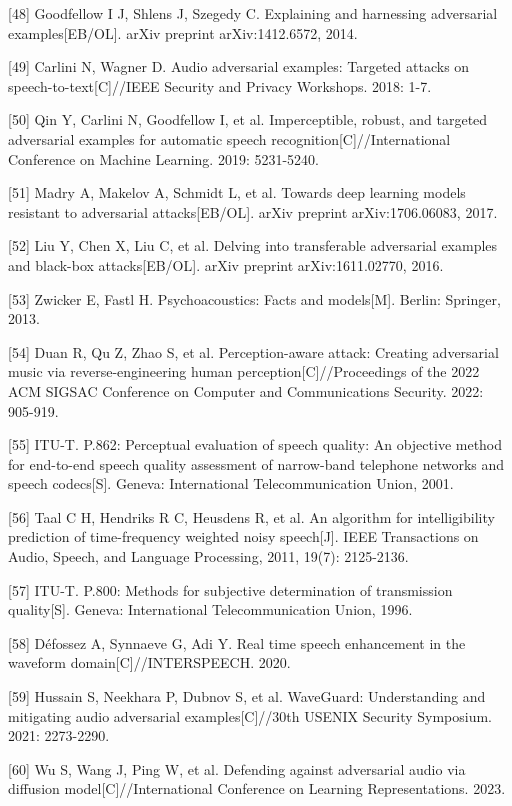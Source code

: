 \begin{referencesblock}
{[}48{]} Goodfellow I J, Shlens J, Szegedy C. Explaining and harnessing
adversarial examples{[}EB/OL{]}. arXiv preprint arXiv:1412.6572, 2014.

{[}49{]} Carlini N, Wagner D. Audio adversarial examples: Targeted
attacks on speech-to-text{[}C{]}//IEEE Security and Privacy Workshops.
2018: 1-7.

{[}50{]} Qin Y, Carlini N, Goodfellow I, et al. Imperceptible, robust,
and targeted adversarial examples for automatic speech
recognition{[}C{]}//International Conference on Machine Learning. 2019:
5231-5240.

{[}51{]} Madry A, Makelov A, Schmidt L, et al. Towards deep learning
models resistant to adversarial attacks{[}EB/OL{]}. arXiv preprint
arXiv:1706.06083, 2017.

{[}52{]} Liu Y, Chen X, Liu C, et al. Delving into transferable
adversarial examples and black-box attacks{[}EB/OL{]}. arXiv preprint
arXiv:1611.02770, 2016.

{[}53{]} Zwicker E, Fastl H. Psychoacoustics: Facts and models{[}M{]}.
Berlin: Springer, 2013.

{[}54{]} Duan R, Qu Z, Zhao S, et al. Perception-aware attack: Creating
adversarial music via reverse-engineering human
perception{[}C{]}//Proceedings of the 2022 ACM SIGSAC Conference on
Computer and Communications Security. 2022: 905-919.

{[}55{]} ITU-T. P.862: Perceptual evaluation of speech quality: An
objective method for end-to-end speech quality assessment of narrow-band
telephone networks and speech codecs{[}S{]}. Geneva: International
Telecommunication Union, 2001.

{[}56{]} Taal C H, Hendriks R C, Heusdens R, et al. An algorithm for
intelligibility prediction of time-frequency weighted noisy
speech{[}J{]}. IEEE Transactions on Audio, Speech, and Language
Processing, 2011, 19(7): 2125-2136.

{[}57{]} ITU-T. P.800: Methods for subjective determination of
transmission quality{[}S{]}. Geneva: International Telecommunication
Union, 1996.

{[}58{]} Défossez A, Synnaeve G, Adi Y. Real time speech enhancement in
the waveform domain{[}C{]}//INTERSPEECH. 2020.

{[}59{]} Hussain S, Neekhara P, Dubnov S, et al. WaveGuard:
Understanding and mitigating audio adversarial examples{[}C{]}//30th
USENIX Security Symposium. 2021: 2273-2290.

{[}60{]} Wu S, Wang J, Ping W, et al. Defending against adversarial
audio via diffusion model{[}C{]}//International Conference on Learning
Representations. 2023.
\end{referencesblock}
